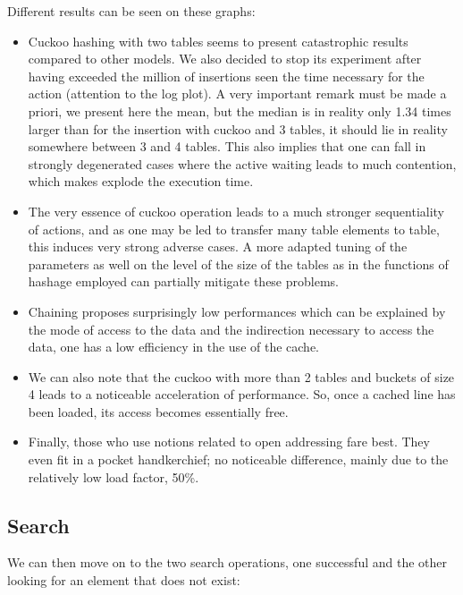 Different results can be seen on these graphs:

\begin{itemize}
    \item Cuckoo hashing with two tables seems to present catastrophic results compared to other models. We also decided to stop its experiment after having exceeded the million of insertions seen the time necessary for the action (attention to the log plot). A very important remark must be made a priori, we present here the mean, but the median is in reality only 1.34 times larger than for the insertion with cuckoo and 3 tables, it should lie in reality somewhere between 3 and 4 tables. This also implies that one can fall in strongly degenerated cases where the active waiting leads to much contention, which makes explode the execution time.
    \item The very essence of cuckoo operation leads to a much stronger sequentiality of actions, and as one may be led to transfer many table elements to table, this induces very strong adverse cases. A more adapted tuning of the parameters as well on the level of the size of the tables as in the functions of hashage employed can partially mitigate these problems.
    \item Chaining proposes surprisingly low performances which can be explained by the mode of access to the data and the indirection necessary to access the data, one has a low efficiency in the use of the cache.
    \item We can also note that the cuckoo with more than 2 tables and buckets of size 4 leads to a noticeable acceleration of performance. So, once a cached line has been loaded, its access becomes essentially free.
    \item Finally, those who use notions related to open addressing fare best. They even fit in a pocket handkerchief; no noticeable difference, mainly due to the relatively low load factor, 50\%.
\end{itemize}

\subsection{Search}

We can then move on to the two search operations, one successful and the other looking for an element that does not exist:

